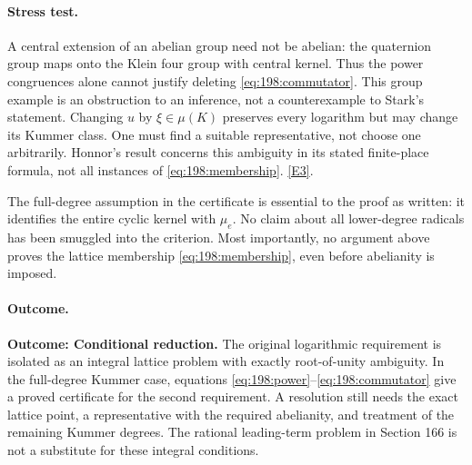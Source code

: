 \documentclass[11pt,a4paper]{article}
\newcommand{\eref}[2]{\hyperlink{extra:#1:#2}{[E#2]}}
\numberwithin{equation}{section}
\begin{document}
\paragraph{Stress test.}
A central extension of an abelian group need not be abelian: the quaternion
group maps onto the Klein four group with central kernel. Thus the
power congruences alone cannot justify deleting
\eqref{eq:198:commutator}. This group example is an obstruction to an
inference, not a counterexample to Stark's statement. Changing $u$ by
$\xi\in\mu(K)$ preserves every logarithm but may change its Kummer
class. One must find a suitable representative, not choose one
arbitrarily. Honnor's result concerns this ambiguity in its stated
finite-place formula, not all instances of \eqref{eq:198:membership}.
\eref{198}{3}.

The full-degree assumption in the certificate is essential to the proof
as written: it identifies the entire cyclic kernel with $\mu_e$.
No claim about all lower-degree radicals has been smuggled into the
criterion. Most importantly, no argument above proves the lattice
membership \eqref{eq:198:membership}, even before abelianity is imposed.

\paragraph{Outcome.}
\textbf{Outcome: Conditional reduction.}
The original logarithmic requirement is isolated as an integral lattice
problem with exactly root-of-unity ambiguity. In the full-degree Kummer
case, equations \eqref{eq:198:power}--\eqref{eq:198:commutator} give a
proved certificate for the second requirement. A resolution still needs
the exact lattice point, a representative with the required abelianity,
and treatment of the remaining Kummer degrees. The rational leading-term
problem in Section 166 is not a substitute for these integral conditions.

\end{document}
